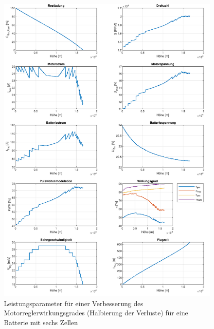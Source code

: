 \begin{appendix}
\begin{figure}[H]
\centering
	\includegraphics[scale=0.7]{Diagramme/Untersuchung_eta_pwm_normal_6.pdf}
	\caption{Leistungsparameter für einer Verbesserung des Motorreglerwirkungsgrades (Halbierung der Verluste) für eine Batterie mit sechs Zellen}
	\label{abb:eta_pwm_6_normal}
\end{figure}


\end{appendix}
